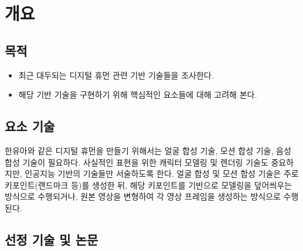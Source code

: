 \section{개요}{\label{sec:intro}}

\subsection{목적}
\begin{itemize}\tightlist
    \item 최근 대두되는 디지털 휴먼 관련 기반 기술들을 조사한다.
    \item 해당 기반 기술을 구현하기 위해 핵심적인 요소들에 대해 고려해 본다.
\end{itemize}

\subsection{요소 기술}
한유아와 같은 디지털 휴먼을 만들기 위해서는 얼굴 합성 기술, 모션 합성 기술, 음성 합성 기술이 필요하다.
사실적인 표현을 위한 캐릭터 모델링 및 렌더링 기술도 중요하지만, 인공지능 기반의 기술들만 서술하도록 한다.
얼굴 합성 및 모션 합성 기술은 주로 키포인트(랜드마크 등)를 생성한 뒤, 해당 키포인트를 기반으로 모델링을 덮어씌우는 방식으로 수행\cite{MeshTalk2021}되거나,
원본 영상을 변형하여 각 영상 프레임을 생성하는 방식으로 수행된다.

\subsection{선정 기술 및 논문}

